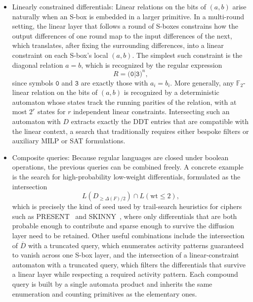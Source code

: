 \begin{itemize}
    \item Linearly constrained differentials: Linear relations on the
          bits of $(a,b)$ arise naturally when an S-box is embedded in
          a larger primitive. In a multi-round setting, the linear
          layer that follows a round of S-boxes constrains how the
          output differences of one round map to the input differences
          of the next, which translates, after fixing the surrounding
          differences, into a linear constraint on each S-box's local
          $(a,b)$. The simplest such constraint is the diagonal
          relation $a = b$, which is recognized by the regular
          expression
          \[
              R = \texttt{(0|3)}^{n},
          \]
          since symbols $\texttt{0}$ and $\texttt{3}$ are exactly those
          with $a_i = b_i$.
          More generally, any $\mathbb{F}_{2}$-linear relation on the
          bits of $(a,b)$ is recognized by a deterministic automaton
          whose states track the running parities of the relation, with
          at most $2^{r}$ states for $r$ independent linear constraints.
          Intersecting such an automaton with $D$ extracts exactly the
          DDT entries that are compatible with the linear context, a
          search that traditionally requires either bespoke filters or
          auxiliary MILP or SAT formulations.

    \item Composite queries: Because regular languages are closed under
          boolean operations, the previous queries can be combined freely.
          A concrete example is the search for high-probability
          low-weight differentials, formulated as the intersection
          \[
              L(D_{\geq \Delta(F)/2}) \cap L(\mathrm{wt} \leq 2),
          \]
          which is precisely the kind of seed used by trail-search
          heuristics for ciphers such as PRESENT~\cite{BogdanovEtAl2007} and SKINNY~\cite{BeierleEtAl2016},
          where only differentials that are both probable enough to
          contribute and sparse enough to survive the diffusion layer
          need to be retained. Other useful combinations include the
          intersection of $\overline{D}$ with a truncated query, which
          enumerates activity patterns guaranteed to vanish across one
          S-box layer, and the intersection of a linear-constraint
          automaton with a truncated query, which filters
          the differentials that survive a linear layer while
          respecting a required activity pattern. Each compound query
          is built by a single automata product and inherits the same
          enumeration and counting primitives as the elementary ones.


\end{itemize}
